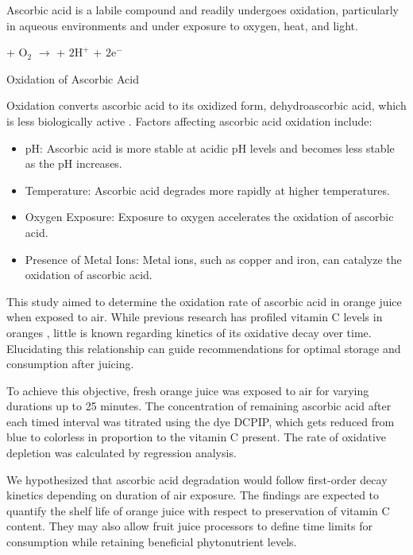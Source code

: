 \documentclass[]{report}
\begin{document}
\begin{multicols}{2}
Ascorbic acid is a labile compound and readily undergoes oxidation, particularly in aqueous environments and under exposure to oxygen, heat, and light. 

\begin{scheme*}
    \centering
     + $\mathrm{O_2}$ $\rightarrow$  + $\mathrm{2H^+}$ + $\mathrm{2e^-}$
    \caption{Oxidation of Ascorbic Acid}
    \label{sch:oxidation}
\end{scheme*}

Oxidation converts ascorbic acid to its oxidized form, dehydroascorbic acid, which is less biologically active \cite{messerschmidt2010}. Factors affecting ascorbic acid oxidation include:

\begin{itemize}
    \item pH: Ascorbic acid is more stable at acidic pH levels and becomes less stable as the pH increases.
    \item Temperature: Ascorbic acid degrades more rapidly at higher temperatures.
    \item Oxygen Exposure: Exposure to oxygen accelerates the oxidation of ascorbic acid.
    \item Presence of Metal Ions: Metal ions, such as copper and iron, can catalyze the oxidation of ascorbic acid.
\end{itemize}

This study aimed to determine the oxidation rate of ascorbic acid in orange juice when exposed to air. While previous research has profiled vitamin C levels in oranges \cite{vines1963}, little is known regarding kinetics of its oxidative decay over time. Elucidating this relationship can guide recommendations for optimal storage and consumption after juicing.

To achieve this objective, fresh orange juice was exposed to air for varying durations up to 25 minutes. The concentration of remaining ascorbic acid after each timed interval was titrated using the dye DCPIP, which gets reduced from blue to colorless in proportion to the vitamin C present. The rate of oxidative depletion was calculated by regression analysis.

We hypothesized that ascorbic acid degradation would follow first-order decay kinetics depending on duration of air exposure. The findings are expected to quantify the shelf life of orange juice with respect to preservation of vitamin C content. They may also allow fruit juice processors to define time limits for consumption while retaining beneficial phytonutrient levels.


\end{multicols}
\end{document}
